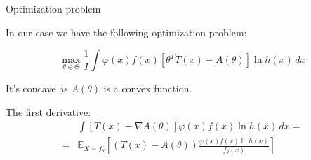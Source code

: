 \documentclass[10pt]{beamer}
\begin{document}
\begin{frame}{Optimization problem}

In our case we have the following optimization problem:

\[
\max_{\theta \in \Theta} \frac 1I \int  \varphi(x) f(x) \left[ \theta^T T(x) - A(\theta) \right] \ln h(x) \, dx
\]

It's concave as $A(\theta)$ is a convex function.

The first derivative: %
\begin{align*}
&\int \left[ T(x) - \nabla A(\theta) \right] \varphi(x)f(x)\ln h(x) \, dx = \\
 = & \mathbb{E}_{X \sim f_{\theta}} \left[ (T(x) - A(\theta))\frac{\varphi(x) f(x) \ln h(x)}{f_{\theta}(x)} \right] 
\end{align*}


\end{frame}
\end{document}
